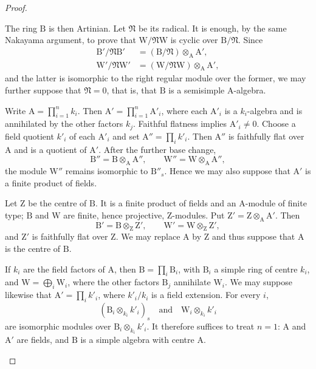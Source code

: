 \begin{proof}
\begin{env}[2.5.8.8]
The ring $\mathrm{B}$ is then Artinian. Let $\mathfrak{N}$ be its
radical. It is enough, by the same Nakayama argument, to prove that
$\mathrm{W}/\mathfrak{N}\mathrm{W}$ is cyclic over
$\mathrm{B}/\mathfrak{N}$. Since
\[
\begin{aligned}
  \mathrm{B}'/\mathfrak{N}\mathrm{B}'
    &=(\mathrm{B}/\mathfrak{N})\otimes_{\mathrm{A}}\mathrm{A}',\\
  \mathrm{W}'/\mathfrak{N}\mathrm{W}'
    &=(\mathrm{W}/\mathfrak{N}\mathrm{W})
      \otimes_{\mathrm{A}}\mathrm{A}',
\end{aligned}
\]
and the latter is isomorphic to the right regular module over the
former, we may further suppose that $\mathfrak{N}=0$, that is, that
$\mathrm{B}$ is a semisimple $\mathrm{A}$-algebra.

Write $\mathrm{A}=\prod_{i=1}^n k_i$. Then
$\mathrm{A}'=\prod_{i=1}^n\mathrm{A}'_i$, where each
$\mathrm{A}'_i$ is a $k_i$-algebra and is annihilated by the other
factors $k_j$. Faithful flatness implies
$\mathrm{A}'_i\neq0$. Choose a field quotient
$k'_i$ of each $\mathrm{A}'_i$ and set
$\mathrm{A}''=\prod_i k'_i$. Then $\mathrm{A}''$ is faithfully flat
over $\mathrm{A}$ and is a quotient of $\mathrm{A}'$. After the further
base change,
\[
  \mathrm{B}''=\mathrm{B}\otimes_{\mathrm{A}}\mathrm{A}'',
  \qquad
  \mathrm{W}''=\mathrm{W}\otimes_{\mathrm{A}}\mathrm{A}'',
\]
the module $\mathrm{W}''$ remains isomorphic to
$\mathrm{B}''_s$. Hence we may also suppose that $\mathrm{A}'$ is a
finite product of fields.

Let $\mathrm{Z}$ be the centre of $\mathrm{B}$. It is a finite product
of fields and an $\mathrm{A}$-module of finite type; $\mathrm{B}$ and
$\mathrm{W}$ are finite, hence projective, $\mathrm{Z}$-modules. Put
$\mathrm{Z}'=\mathrm{Z}\otimes_{\mathrm{A}}\mathrm{A}'$. Then
\[
  \mathrm{B}'=\mathrm{B}\otimes_{\mathrm{Z}}\mathrm{Z}',
  \qquad
  \mathrm{W}'=\mathrm{W}\otimes_{\mathrm{Z}}\mathrm{Z}',
\]
and $\mathrm{Z}'$ is faithfully flat over $\mathrm{Z}$. We may replace
$\mathrm{A}$ by $\mathrm{Z}$ and thus suppose that $\mathrm{A}$ is the
centre of $\mathrm{B}$.

If $k_i$ are the field factors of $\mathrm{A}$, then
$\mathrm{B}=\prod_i\mathrm{B}_i$, with $\mathrm{B}_i$ a simple ring of
centre $k_i$, and
$\mathrm{W}=\bigoplus_i\mathrm{W}_i$, where the other factors
$\mathrm{B}_j$ annihilate $\mathrm{W}_i$. We may suppose likewise that
$\mathrm{A}'=\prod_i k'_i$, where $k'_i/k_i$ is a field extension.
For every $i$,
\[
  (\mathrm{B}_i\otimes_{k_i}k'_i)_s
  \quad\text{and}\quad
  \mathrm{W}_i\otimes_{k_i}k'_i
\]
are isomorphic modules over $\mathrm{B}_i\otimes_{k_i}k'_i$.
It therefore suffices to treat $n=1$: $\mathrm{A}$ and $\mathrm{A}'$
are fields, and $\mathrm{B}$ is a simple algebra with centre
$\mathrm{A}$.
\end{env}


\end{proof}
